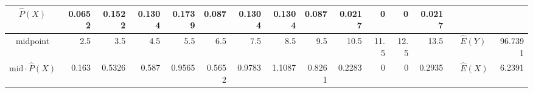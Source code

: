 \begin{table}[ht]
\begin{adjustbox}{width = \textwidth, center}
\begin{tabular}{|rr|r|r|r|r|r|r|r|r|r|r|r|r|r|r|r|}
            \multicolumn{2}{|c|}{\cellcolor[HTML]{FCE5CD}$\widehat{P}(X)$}                  & \cellcolor[HTML]{FCE5CD}0.0652                 & \cellcolor[HTML]{FCE5CD}0.1522                 & \cellcolor[HTML]{FCE5CD}0.1304                 & \cellcolor[HTML]{FCE5CD}0.1739                 & \cellcolor[HTML]{FCE5CD}0.087                  & \cellcolor[HTML]{FCE5CD}0.1304                 & \cellcolor[HTML]{FCE5CD}0.1304                 & \cellcolor[HTML]{FCE5CD}0.087                   & \cellcolor[HTML]{FCE5CD}0.0217                  & \cellcolor[HTML]{FCE5CD}0                       & \cellcolor[HTML]{FCE5CD}0                       & \cellcolor[HTML]{FCE5CD}0.0217                  & \multicolumn{1}{l|}{}                                                           & \multicolumn{1}{l|}{}                                                   & \multicolumn{1}{l|}{}                                                                 \\ \hline
            \multicolumn{2}{|c|}{\cellcolor[HTML]{FCE5CD}midpoint}                          & \cellcolor[HTML]{FCE5CD}2.5                    & \cellcolor[HTML]{FCE5CD}3.5                    & \cellcolor[HTML]{FCE5CD}4.5                    & \cellcolor[HTML]{FCE5CD}5.5                    & \cellcolor[HTML]{FCE5CD}6.5                    & \cellcolor[HTML]{FCE5CD}7.5                    & \cellcolor[HTML]{FCE5CD}8.5                    & \cellcolor[HTML]{FCE5CD}9.5                     & \cellcolor[HTML]{FCE5CD}10.5                    & \cellcolor[HTML]{FCE5CD}11.5                    & \cellcolor[HTML]{FCE5CD}12.5                    & \cellcolor[HTML]{FCE5CD}13.5                    & \multicolumn{1}{l|}{}                                                           & \multicolumn{1}{l|}{\cellcolor[HTML]{D0E0E3}$\widehat{E}(Y)$}           & \cellcolor[HTML]{D0E0E3}96.7391                                                       \\ \hline
            \multicolumn{2}{|c|}{\cellcolor[HTML]{FCE5CD}$\mathrm{mid}\cdot\widehat{P}(X)$} & \cellcolor[HTML]{FCE5CD}0.163                  & \cellcolor[HTML]{FCE5CD}0.5326                 & \cellcolor[HTML]{FCE5CD}0.587                  & \cellcolor[HTML]{FCE5CD}0.9565                 & \cellcolor[HTML]{FCE5CD}0.5652                 & \cellcolor[HTML]{FCE5CD}0.9783                 & \cellcolor[HTML]{FCE5CD}1.1087                 & \cellcolor[HTML]{FCE5CD}0.8261                  & \cellcolor[HTML]{FCE5CD}0.2283                  & \cellcolor[HTML]{FCE5CD}0                       & \cellcolor[HTML]{FCE5CD}0                       & \cellcolor[HTML]{FCE5CD}0.2935                  & \multicolumn{1}{l|}{}                                                           & \multicolumn{1}{l|}{\cellcolor[HTML]{D0E0E3}$\widehat{E}(X)$}           & \cellcolor[HTML]{D0E0E3}6.2391                                                        \\ \hline
            \end{tabular}
    \end{adjustbox}
\end{table}\\
